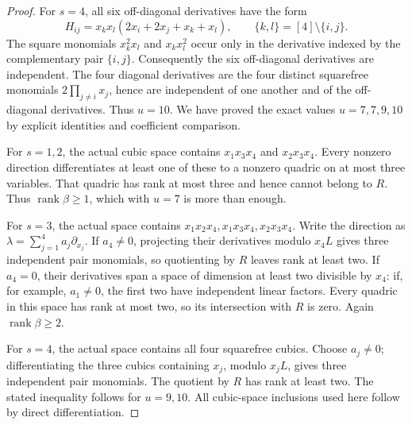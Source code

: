 \documentclass[11pt]{amsart}
\theoremstyle{definition}
\numberwithin{equation}{section}
\newcommand{\rank}{\operatorname{rank}}
\begin{document}
\begin{proof}
For \(s=4\), all six off-diagonal derivatives have the form
\[
H_{ij}=x_kx_l(2x_i+2x_j+x_k+x_l),\qquad
\{k,l\}=[4]\setminus\{i,j\}.
\]
The square monomials \(x_k^2x_l\) and \(x_kx_l^2\) occur only in
the derivative indexed by the complementary pair \(\{i,j\}\).
Consequently the six off-diagonal derivatives are independent.
The four diagonal derivatives are the four distinct squarefree monomials
\(2\prod_{j\ne i}x_j\), hence are independent of one another and of the
off-diagonal derivatives. Thus \(u=10\).
We have proved the exact values \(u=7,7,9,10\) by explicit identities
and coefficient comparison.

For \(s=1,2\), the actual cubic space contains \(x_1x_3x_4\) and
\(x_2x_3x_4\). Every nonzero direction differentiates at least one of
these to a nonzero quadric on at most three variables. That quadric has
rank at most three and hence cannot belong to \(R\). Thus \(\rank\beta\ge1\),
which with \(u=7\) is more than enough.

For \(s=3\), the actual space contains
\(x_1x_2x_4,x_1x_3x_4,x_2x_3x_4\). Write the direction as
\(\lambda=\sum_{j=1}^4a_j\partial_{x_j}\). If \(a_4\ne0\), projecting
their derivatives modulo \(x_4L\) gives three independent pair monomials,
so quotienting by \(R\) leaves rank at least two. If \(a_4=0\), their
derivatives span a space of dimension at least two divisible by \(x_4\):
if, for example, \(a_1\ne0\), the first two have independent linear
factors. Every quadric in this space has rank at most two, so its
intersection with \(R\) is zero. Again \(\rank\beta\ge2\).

For \(s=4\), the actual space contains all four squarefree cubics. Choose
\(a_j\ne0\); differentiating the three cubics containing \(x_j\), modulo
\(x_jL\), gives three independent pair monomials. The quotient by \(R\)
has rank at least two. The stated inequality follows for \(u=9,10\).
All cubic-space inclusions used here follow by direct differentiation.
\end{proof}
\end{document}
